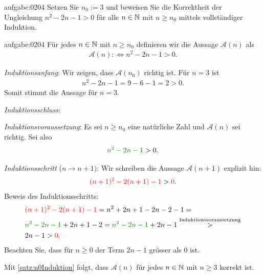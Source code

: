\begin{aufgabe}{aufgabe:0204}
Setzen Sie $n_0 := 3$ und beweisen Sie die Korrektheit der Ungleichung $n^2 - 2n - 1 > 0$ für alle $n\in\mathbb{N}$ mit $n\geq n_0$ mittels vollständiger Induktion.
\end{aufgabe}

\begin{antwort}{aufgabe:0204}
Für jedes $n\in\mathbb{N}$ mit $n\geq n_0$ definieren wir die Aussage $\mathcal{A}(n)$ als
\begin{align*}
    \mathcal{A}(n) :\iff n^2-2n-1 > 0.
\end{align*}
\begin{aenum}
    \item \textit{Induktionsanfang}: Wir zeigen, dass $\mathcal{A}(n_0)$ richtig ist. Für $n=3$ ist
    \begin{align*}
        n^2-2n-1 = 9-6-1 = 2 > 0.
    \end{align*}
    Somit stimmt die Aussage für $n=3$.
    \item \textit{Induktionsschluss}:
        \begin{renum}
            \item \textit{Induktionsvoraussetzung}: Es sei $n\geq n_0$ eine natürliche Zahl und $\mathcal{A}(n)$ sei richtig. Sei also
            \begin{align*}
                \textcolor{Green}{n^2-2n-1} > 0.
            \end{align*}
            \item \textit{Induktionsschritt} ($n\to n+1)$: Wir schreiben die Aussage $\mathcal{A}(n+1)$ explizit hin:
            \begin{align*}
                \textcolor{Red}{(n+1)^2-2(n+1)-1} > \textcolor{Red}{0}.
            \end{align*}
            Beweis des Induktionsschritts:
            \begin{align*}
                &\textcolor{Red}{(n+1)^2-2(n+1)-1} = n^2 + 2n + 1 - 2n - 2 - 1 = \\
                &\textcolor{Green}{n^2-2n-1} + 2n+1-2 = \textcolor{Green}{n^2-2n-1} + 2n-1 \stackrel{\text{Induktionsvoraussetzung}}{>}\\
                &2n-1 > \textcolor{Red}{0}.
            \end{align*}
        Beachten Sie, dass für $n\geq 0$ der Term $2n-1$ grösser als $0$ ist.
        \end{renum}
\end{aenum}
Mit \cref{satz:n0Induktion} folgt, dass $\mathcal{A}(n)$ für jedes $n\in\mathbb{N}$ mit $n\geq 3$ korrekt ist.
\end{antwort}

